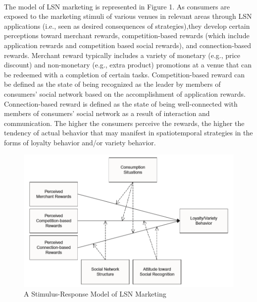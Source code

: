 \paragraph{}The model of LSN marketing is represented in Figure 1. As consumers are exposed to the marketing stimuli of various venues in
relevant areas through LSN applications (i.e., seen as desired consequences of strategies),they develop certain perceptions toward merchant rewards, competition-based rewards (which include application rewards and competition based social rewards), and connection-based rewards. Merchant reward typically includes a variety of monetary (e.g., price discount) and non-monetary (e.g., extra product) promotions at a venue that can be redeemed with a completion of certain tasks. Competition-based reward can be deﬁned as the state of being recognized as the leader by members of consumers’ social network based on the accomplishment of application rewards. Connection-based reward is deﬁned as the state of being well-connected with members of consumers’ social network as a result of interaction and communication. The higher the consumers perceive the rewards, the higher the tendency of actual behavior that may manifest in spatiotemporal strategies in the forms of loyalty behavior and/or variety behavior. 
\begin{figure}[h]
\center
\includegraphics[scale=.8]{1.png}   
\caption{A Stimulus-Response Model of LSN Marketing }
\label{fig1}
\end{figure}
